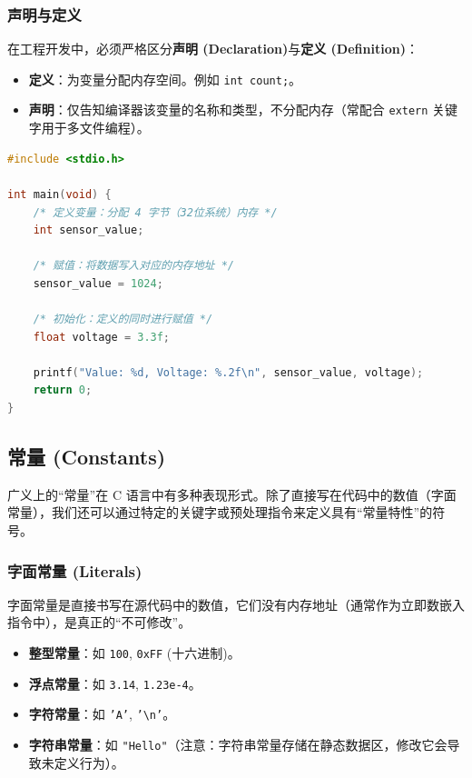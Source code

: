 \subsubsection{声明与定义}
在工程开发中，必须严格区分\textbf{声明 (Declaration)}与\textbf{定义 (Definition)}：
\begin{itemize}
    \item \textbf{定义}：为变量分配内存空间。例如 \texttt{int count;}。
    \item \textbf{声明}：仅告知编译器该变量的名称和类型，不分配内存（常配合 \texttt{extern} 关键字用于多文件编程）。
\end{itemize}

\begin{lstlisting}[language=C, caption={变量的定义与赋值}, label={lst:variable_def}]
#include <stdio.h>

int main(void) {
    /* 定义变量：分配 4 字节（32位系统）内存 */
    int sensor_value; 
    
    /* 赋值：将数据写入对应的内存地址 */
    sensor_value = 1024; 
    
    /* 初始化：定义的同时进行赋值 */
    float voltage = 3.3f; 
    
    printf("Value: %d, Voltage: %.2f\n", sensor_value, voltage);
    return 0;
}
\end{lstlisting}

\subsection{常量 (Constants)}

广义上的“常量”在 C 语言中有多种表现形式。除了直接写在代码中的数值（字面常量），我们还可以通过特定的关键字或预处理指令来定义具有“常量特性”的符号。

\subsubsection{字面常量 (Literals)}
字面常量是直接书写在源代码中的数值，它们没有内存地址（通常作为立即数嵌入指令中），是真正的“不可修改”。
\begin{itemize}
    \item \textbf{整型常量}：如 \texttt{100}, \texttt{0xFF} (十六进制)。
    \item \textbf{浮点常量}：如 \texttt{3.14}, \texttt{1.23e-4}。
    \item \textbf{字符常量}：如 \texttt{'A'}, \texttt{'\textbackslash n'}。
    \item \textbf{字符串常量}：如 \texttt{"Hello"}（注意：字符串常量存储在静态数据区，修改它会导致未定义行为）。
\end{itemize}

